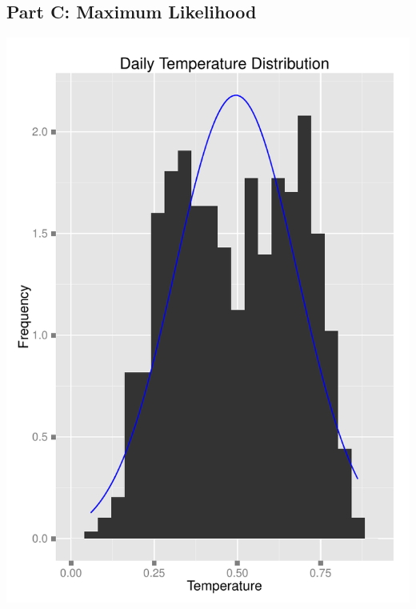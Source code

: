\documentclass[11pt]{article}
\begin{document}
\subsection{Part C: Maximum Likelihood}
\label{subsesc:problem3cmaximumlikelihood}
\includegraphics{Problem3CMLE.pdf}
\newline
\pagebreak
\end{document}
